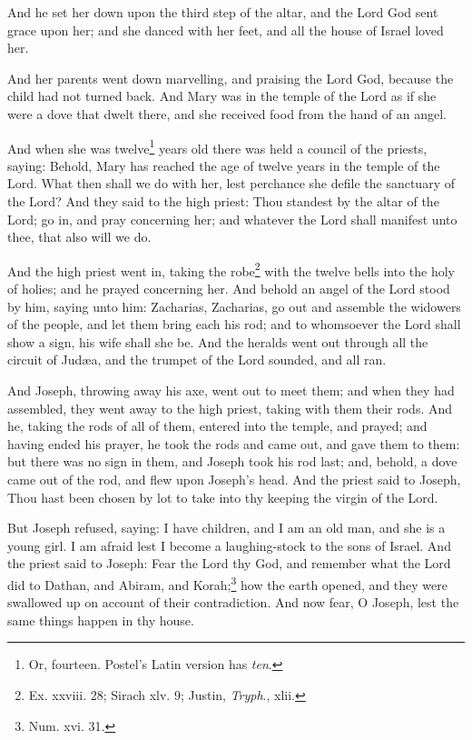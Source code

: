 \pend\pstart
And he set her down upon the third step of the altar, and the Lord God sent grace upon her; and she danced with her feet, and all the house of Israel loved her.

\pend\pstart
{}

\pend\setcounter{pstartR}{1}\pstart
And her parents went down marvelling, and praising the Lord God, because the child had not turned back. And Mary was in the temple of the Lord as if she were a dove that dwelt there, and she received food from the hand of an angel.

\pend\pstart
And when she was twelve\footnote{Or, fourteen. Postel's Latin version has \textit{ten}.} years old there was held a council of the priests, saying: Behold, Mary has reached the age of twelve years in the temple of the Lord. What then shall we do with her, lest perchance she defile the sanctuary of the Lord? And they said to the high priest: Thou standest by the altar of the Lord; go in, and pray concerning her; and whatever the Lord shall manifest unto thee, that also will we do.

\pend\pstart
And the high priest went in, taking the robe\footnote{Ex. xxviii. 28; Sirach xlv. 9; Justin, \textit{Tryph}., xlii.} with the twelve bells into the holy of holies; and he prayed concerning her. And behold an angel of the Lord stood by him, saying unto him: Zacharias, Zacharias, go out and assemble the widowers of the people, and let them bring each his rod; and to whomsoever the Lord shall show a sign, his wife shall she be. And the heralds went out through all the circuit of Judæa, and the trumpet of the Lord sounded, and all ran.

\pend\pstart
{}

\pend\setcounter{pstartR}{1}\pstart
And Joseph, throwing away his axe, went out to meet them; and when they had assembled, they went away to the high priest, taking with them their rods. And he, taking the rods of all of them, entered into the temple, and prayed; and having ended his prayer, he took the rods and came out, and gave them to them: but there was no sign in them, and Joseph took his rod last; and, behold, a dove came out of the rod, and flew upon Joseph's head. And the priest said to Joseph, Thou hast been chosen by lot to take into thy keeping the virgin of the Lord.

\pend\pstart
But Joseph refused, saying: I have children, and I am an old man, and she is a young girl. I am afraid lest I become a laughing-stock to the sons of Israel. And the priest said to Joseph: Fear the Lord thy God, and remember what the Lord did to Dathan, and Abiram, and Korah;\footnote{Num. xvi. 31.} how the earth opened, and they were swallowed up on account of their contradiction. And now fear, O Joseph, lest the same things happen in thy house.

